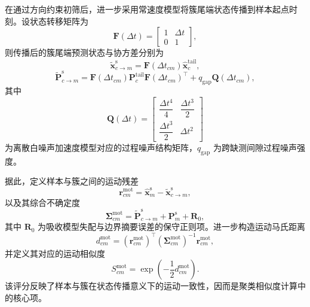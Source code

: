 \documentclass{xdupgthesis}
\begin{document}
在通过方向约束初筛后，进一步采用常速度模型将簇尾端状态传播到样本起点时刻。设状态转移矩阵为
\begin{equation}
	\mathbf{F}(\Delta t)=
	\begin{bmatrix}
		1 & \Delta t\\
		0 & 1
	\end{bmatrix},
\end{equation}
则传播后的簇尾端预测状态与协方差分别为
\begin{equation}
	\tilde{\mathbf{x}}_{c\rightarrow m}^{\mathrm{s}}
	=
	\mathbf{F}(\Delta t_{cm})\hat{\mathbf{x}}_c^{\mathrm{tail}},
\end{equation}
\begin{equation}
	\tilde{\mathbf{P}}_{c\rightarrow m}^{\mathrm{s}}
	=
	\mathbf{F}(\Delta t_{cm})\mathbf{P}_c^{\mathrm{tail}}\mathbf{F}(\Delta t_{cm})^{\top}
	+
	q_{\mathrm{gap}}\mathbf{Q}(\Delta t_{cm}),
\end{equation}
其中
\begin{equation}
	\mathbf{Q}(\Delta t)=
	\begin{bmatrix}
		\dfrac{\Delta t^4}{4} & \dfrac{\Delta t^3}{2}\\[6pt]
		\dfrac{\Delta t^3}{2} & \Delta t^2
	\end{bmatrix}
\end{equation}
为离散白噪声加速度模型对应的过程噪声结构矩阵，$q_{\mathrm{gap}}$ 为跨缺测间隙过程噪声强度。

据此，定义样本与簇之间的运动残差
\begin{equation}
	\mathbf{r}_{cm}^{\mathrm{mot}}
	=
	\hat{\mathbf{x}}_m^{\mathrm{s}}
	-
	\tilde{\mathbf{x}}_{c\rightarrow m}^{\mathrm{s}},
\end{equation}
以及其综合不确定度
\begin{equation}
	\mathbf{\Sigma}_{cm}^{\mathrm{mot}}
	=
	\tilde{\mathbf{P}}_{c\rightarrow m}^{\mathrm{s}}
	+
	\mathbf{P}_m^{\mathrm{s}}
	+
	\mathbf{R}_{0},
\end{equation}
其中 $\mathbf{R}_{0}$ 为吸收模型失配与边界摘要误差的保守正则项。进一步构造运动马氏距离
\begin{equation}
	d_{cm}^{\mathrm{mot}}
	=
	\left(\mathbf{r}_{cm}^{\mathrm{mot}}\right)^{\top}
	\left(\mathbf{\Sigma}_{cm}^{\mathrm{mot}}\right)^{-1}
	\mathbf{r}_{cm}^{\mathrm{mot}},
\end{equation}
并定义其对应的运动相似度
\begin{equation}
	S_{cm}^{\mathrm{mot}}
	=
	\exp\!\left(-\frac{1}{2}d_{cm}^{\mathrm{mot}}\right).
\end{equation}
该评分反映了样本与簇在状态传播意义下的运动一致性，因而是聚类相似度计算中的核心项。
\end{document}
